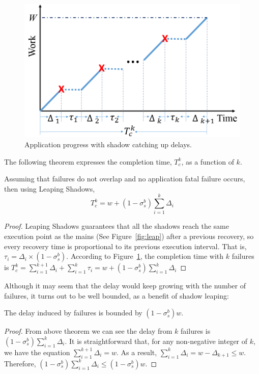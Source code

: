\begin{figure}[!h]
	\begin{center}
		\includegraphics[width=0.8\columnwidth]{Figures/app_progress}
	\end{center}
	\caption{Application progress with shadow catching up delays.}
	\label{fig:progress}
\end{figure}


The following theorem expresses the completion time, $T_c^k$, as a function of $k$.

\begin{theorem}
Assuming that failures do not overlap and no application fatal failure occurs, then using Leaping Shadows, 
	$$T_c^k = w + (1-\sigma_s^b)\sum_{i=1}^k\Delta_i$$
\end{theorem}
\begin{proof}
Leaping Shadows guarantees that all the shadows reach the same execution point as the mains (See Figure~\ref{fig:leap}) after a previous recovery, so every recovery time is proportional to its previous execution interval. 
That is, $\tau_i = \Delta_i \times (1 - \sigma_s^b)$. 
According to Figure~\ref{fig:progress}, the completion time with $k$ failures is 
	$T_c^k = \sum_{i=1}^{k+1}\Delta_i + \sum_{i=1}^k\tau_i = w + (1-\sigma_s^b)\sum_{i=1}^k\Delta_i$
\end{proof}

Although it may seem that the delay would keep growing with the number of failures, 
it turns out to be well bounded, as a benefit of shadow leaping: 

\begin{corollary}
The delay induced by failures is bounded by $(1-\sigma_s^b)w$.
\end{corollary}
\begin{proof}
From above theorem we can see the delay from $k$ failures is $(1-\sigma_s^b)\sum_{i=1}^k\Delta_i$. It is straightforward that, for any non-negative integer of $k$, we have the equation $\sum_{i=1}^{k+1}\Delta_i= w$. As a result, 
$\sum_{i=1}^{k}\Delta_i = w - \Delta_{k+1} \le w$. Therefore, $(1-\sigma_s^b)\sum_{i=1}^k\Delta_i \le (1-\sigma_s^b)w$.
\end{proof}

